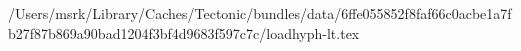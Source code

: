 /Users/msrk/Library/Caches/Tectonic/bundles/data/6ffe055852f8faf66c0acbe1a7fb27f87b869a90bad1204f3bf4d9683f597c7c/loadhyph-lt.tex